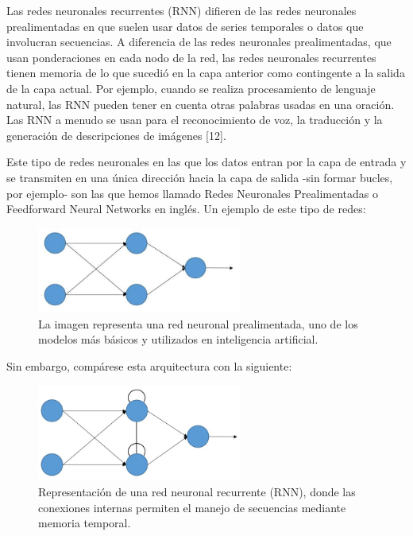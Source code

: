 Las redes neuronales recurrentes (RNN) difieren de las redes neuronales prealimentadas en que suelen usar datos de series temporales o datos que involucran secuencias. A diferencia de las redes neuronales prealimentadas, que usan ponderaciones en cada nodo de la red, las redes neuronales recurrentes tienen memoria de lo que sucedió en la capa anterior como contingente a la salida de la capa actual. Por ejemplo, cuando se realiza procesamiento de lenguaje natural, las RNN pueden tener en cuenta otras palabras usadas en una oración. Las RNN a menudo se usan para el reconocimiento de voz, la traducción y la generación de descripciones de imágenes [12].

Este tipo de redes neuronales en las que los datos entran por la capa de entrada y se transmiten en una única dirección hacia la capa de salida -sin formar bucles, por ejemplo- son las que hemos llamado Redes Neuronales Prealimentadas o Feedforward Neural Networks en inglés. Un ejemplo de este tipo de redes:

\begin{figure}[H]
  \centering
  \includegraphics[width=0.6\textwidth]{imagenes_doc/image_01.jpg}
  \caption{La imagen representa una red neuronal prealimentada, uno de los modelos más básicos y utilizados en inteligencia artificial.}
  \label{fig:logo}
\end{figure}

Sin embargo, compárese esta arquitectura con la siguiente:

\begin{figure}[H]
  \centering
  \includegraphics[width=0.6\textwidth]{imagenes_doc/image_02.jpg}
  \caption{Representación de una red neuronal recurrente (RNN), donde las conexiones internas permiten el manejo de secuencias mediante memoria temporal.}
  \label{fig:logo}
\end{figure}

